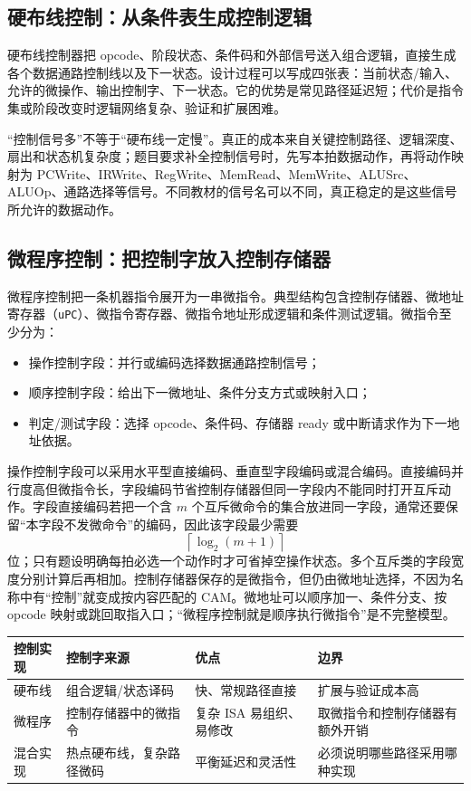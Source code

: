 \documentclass[UTF8,fontset=fandol,11pt,a4paper]{ctexart}
\begin{document}
\subsection{硬布线控制：从条件表生成控制逻辑}

硬布线控制器把 opcode、阶段状态、条件码和外部信号送入组合逻辑，直接生成各个数据通路控制线以及下一状态。设计过程可以写成四张表：当前状态/输入、允许的微操作、输出控制字、下一状态。它的优势是常见路径延迟短；代价是指令集或阶段改变时逻辑网络复杂、验证和扩展困难。

“控制信号多”不等于“硬布线一定慢”。真正的成本来自关键控制路径、逻辑深度、扇出和状态机复杂度；题目要求补全控制信号时，先写本拍数据动作，再将动作映射为 PCWrite、IRWrite、RegWrite、MemRead、MemWrite、ALUSrc、ALUOp、通路选择等信号。不同教材的信号名可以不同，真正稳定的是这些信号所允许的数据动作。

\subsection{微程序控制：把控制字放入控制存储器}

微程序控制把一条机器指令展开为一串微指令。典型结构包含控制存储器、微地址寄存器（\texttt{uPC}）、微指令寄存器、微指令地址形成逻辑和条件测试逻辑。微指令至少分为：
\begin{itemize}
  \item 操作控制字段：并行或编码选择数据通路控制信号；
  \item 顺序控制字段：给出下一微地址、条件分支方式或映射入口；
  \item 判定/测试字段：选择 opcode、条件码、存储器 ready 或中断请求作为下一地址依据。
\end{itemize}
操作控制字段可以采用水平型直接编码、垂直型字段编码或混合编码。直接编码并行度高但微指令长，字段编码节省控制存储器但同一字段内不能同时打开互斥动作。字段直接编码若把一个含 $m$ 个互斥微命令的集合放进同一字段，通常还要保留“本字段不发微命令”的编码，因此该字段最少需要
\[
\left\lceil\log_2(m+1)\right\rceil
\]
位；只有题设明确每拍必选一个动作时才可省掉空操作状态。多个互斥类的字段宽度分别计算后再相加。控制存储器保存的是微指令，但仍由微地址选择，不因为名称中有“控制”就变成按内容匹配的 CAM。微地址可以顺序加一、条件分支、按 opcode 映射或跳回取指入口；“微程序控制就是顺序执行微指令”是不完整模型。

\begin{center}\small
\begin{tabularx}{\linewidth}{L{2.5cm}L{3.0cm}L{3.0cm}Y}
\toprule
控制实现 & 控制字来源 & 优点 & 边界 \\
\midrule
硬布线 & 组合逻辑/状态译码 & 快、常规路径直接 & 扩展与验证成本高 \\
微程序 & 控制存储器中的微指令 & 复杂 ISA 易组织、易修改 & 取微指令和控制存储器有额外开销 \\
混合实现 & 热点硬布线，复杂路径微码 & 平衡延迟和灵活性 & 必须说明哪些路径采用哪种实现 \\
\bottomrule
\end{tabularx}
\end{center}
\end{document}

